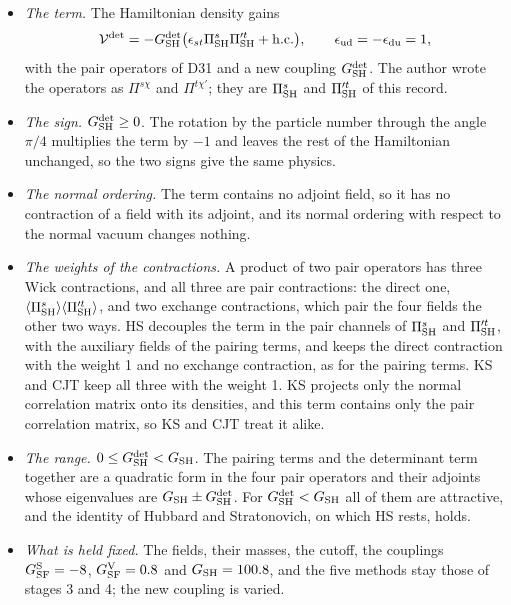 \documentclass[
  10pt,
]{article}
\providecommand{\tightlist}{%
  \setlength{\itemsep}{0pt}\setlength{\parskip}{0pt}}
\begin{document}
\begin{itemize}
\tightlist
\item
  \emph{The term.} The Hamiltonian density gains
  \[\mathcal V^{\rm det}=-G^{\rm det}_{\rm SH}\big(\epsilon_{st}\Pi^s_{\rm SH}\Pi'^t_{\rm SH}+{\rm h.c.}\big),\qquad\epsilon_{\rm ud}=-\epsilon_{\rm du}=1,\]
  with the pair operators of D31 and a new coupling
  \(G^{\rm det}_{\rm SH}\). The author wrote the operators as
  \(\Pi^{s\chi}\) and \(\Pi^{t\chi'}\); they are \(\Pi^s_{\rm SH}\) and
  \(\Pi'^t_{\rm SH}\) of this record.
\item
  \emph{The sign.} \(G^{\rm det}_{\rm SH}\ge0\). The rotation by the
  particle number through the angle \(\pi/4\) multiplies the term by
  \(-1\) and leaves the rest of the Hamiltonian unchanged, so the two
  signs give the same physics.
\item
  \emph{The normal ordering.} The term contains no adjoint field, so it
  has no contraction of a field with its adjoint, and its normal
  ordering with respect to the normal vacuum changes nothing.
\item
  \emph{The weights of the contractions.} A product of two pair
  operators has three Wick contractions, and all three are pair
  contractions: the direct one,
  \(\langle\Pi^s_{\rm SH}\rangle\langle\Pi'^t_{\rm SH}\rangle\), and two
  exchange contractions, which pair the four fields the other two ways.
  HS decouples the term in the pair channels of \(\Pi^s_{\rm SH}\) and
  \(\Pi'^t_{\rm SH}\), with the auxiliary fields of the pairing terms,
  and keeps the direct contraction with the weight 1 and no exchange
  contraction, as for the pairing terms. KS and CJT keep all three with
  the weight 1. KS projects only the normal correlation matrix onto its
  densities, and this term contains only the pair correlation matrix, so
  KS and CJT treat it alike.
\item
  \emph{The range.} \(0\le G^{\rm det}_{\rm SH}<G_{\rm SH}\). The
  pairing terms and the determinant term together are a quadratic form
  in the four pair operators and their adjoints whose eigenvalues are
  \(G_{\rm SH}\pm G^{\rm det}_{\rm SH}\). For
  \(G^{\rm det}_{\rm SH}<G_{\rm SH}\) all of them are attractive, and
  the identity of Hubbard and Stratonovich, on which HS rests, holds.
\item
  \emph{What is held fixed.} The fields, their masses, the cutoff, the
  couplings \(G^{\rm S}_{\rm SF}=-8\), \(G^{\rm V}_{\rm SF}=0.8\) and
  \(G_{\rm SH}=100.8\), and the five methods stay those of stages 3 and
  4; the new coupling is varied.

\end{itemize}
\end{document}

